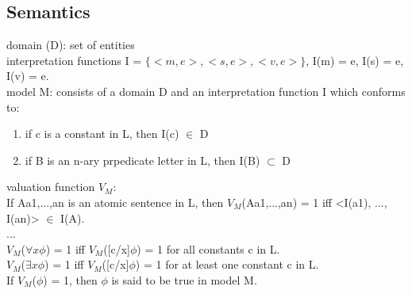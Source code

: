 \subsection*{Semantics}
domain (D): set of entities \\
interpretation functions I = $\{<m, e>, <s, e>, <v, e> \}$, I(m) = e, I(s) = e, I(v) = e. \\
model M: consists of a domain D and an interpretation function I which conforms to:

\begin{enumerate}
\item if c is a constant in L, then I(c) $\in$ D
\item if B is an n-ary prpedicate letter in L, then I(B) $\subset$ D
\end{enumerate}

valuation function $V_M$: \\
If Aa1,...,an is an atomic sentence in L, then $V_M$(Aa1,...,an) = 1 iff <I(a1), ..., I(an)> $\in$ I(A). \\
... \\
$V_M$($\forall x \phi$) = 1 iff $V_M$([c/x]$\phi$) = 1 for all constants c in L. \\
$V_M$($\exists x \phi$) = 1 iff $V_M$([c/x]$\phi$) = 1 for at least one constant c in L. \\
If $V_M$($\phi$) = 1, then $\phi$ is said to be true in model M.


